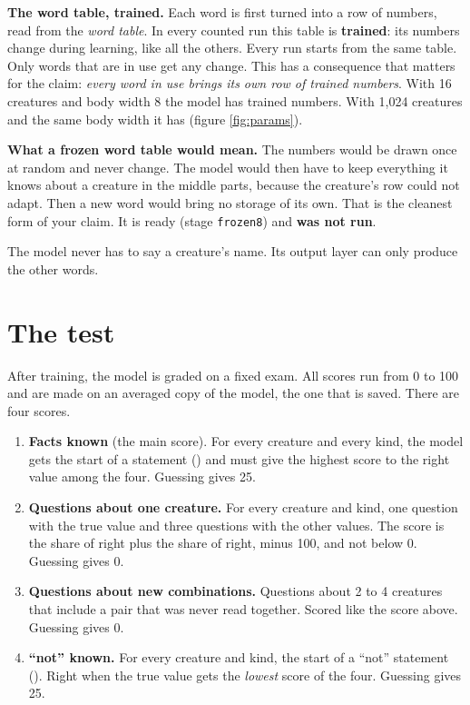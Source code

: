 \textbf{The word table, trained.} Each word is first turned into a row of 
numbers, read from the \emph{word table}. In every counted run this table is \textbf{trained}:
its numbers change during learning, like all the others. Every run starts from the same table.
Only words that are in use get any change. This has a consequence that matters for the claim:
\emph{every word in use brings its own row of  trained numbers}. With 16
creatures and body width 8 the model has  trained numbers.
With 1,024 creatures and the same body width it has 
(figure \ref{fig:params}).

\textbf{What a frozen word table would mean.} The numbers would be drawn once at random and
never change. The model would then have to keep everything it knows about a creature in the
middle parts, because the creature's row could not adapt. Then a new word would bring no
storage of its own. That is the cleanest form of your claim. It is ready (stage
\texttt{frozen8}) and \textbf{was not run}.

The model never has to say a creature's name. Its output layer can only produce the other words.

\section{The test}\label{sec:exam}

After training, the model is graded on a fixed exam. All scores run from 0 to 100 and are made on
an averaged copy of the model, the one that is saved. There are four scores.

\begin{enumerate}[itemsep=1.5pt]
\item \textbf{Facts known} (the main score). For every creature and every kind, the model gets
  the start of a statement () and must give the highest score to the right value
  among the four. Guessing gives 25.
\item \textbf{Questions about one creature.} For every creature and kind, one  question
  with the true value and three  questions with the other values. The score is the share
  of  right plus the share of  right, minus 100, and not below 0. Guessing gives 0.
\item \textbf{Questions about new combinations.} Questions about 2 to 4 creatures that include a
  pair that was never read together. Scored like the score above. Guessing gives 0.
\item \textbf{``not'' known.} For every creature and kind, the start of a ``not'' statement
  (). Right when the true value gets the \emph{lowest} score of the four.
  Guessing gives 25.
\end{enumerate}

